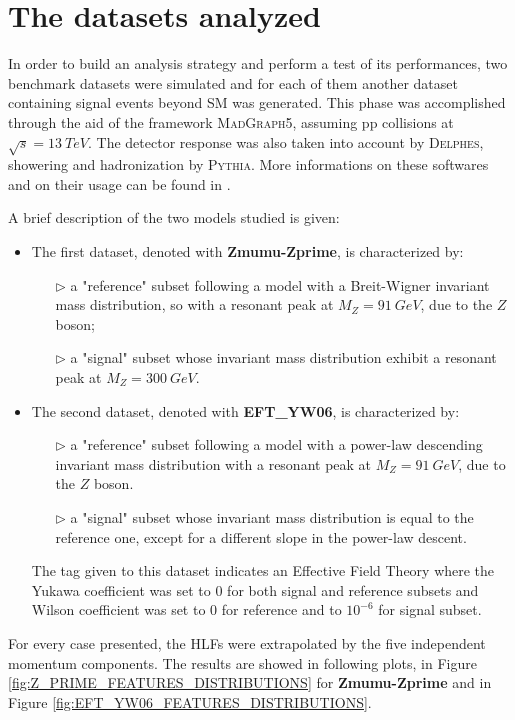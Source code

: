 \section{The datasets analyzed}
In order to build an analysis strategy and perform a test of its performances, two benchmark datasets were simulated and for each of them another dataset containing signal events beyond SM was generated. This phase was accomplished through the aid of the framework \textsc{MadGraph5}, assuming pp collisions at $\sqrt{s} = 13~\si{TeV}$. The detector response was also taken into account by \textsc{Delphes}, showering and hadronization by \textsc{Pythia}. More informations on these softwares and on their usage can be found in \cite{madgraph}.

A brief description of the two models studied is given:
\begin{itemize}
	\item The first dataset, denoted with \textbf{Zmumu-Zprime}, is characterized by:
	\begin{itemize}
		\item[$\triangleright$] a "reference" subset following a model with a Breit-Wigner invariant mass distribution, so with a resonant peak at $M_{Z} = 91~\si{GeV}$, due to the $Z$ boson;
		\item[$\triangleright$] a "signal" subset whose invariant mass distribution exhibit a resonant peak at $M_{Z} = 300~\si{GeV}$.
	\end{itemize}
	
	\item The second dataset, denoted with \textbf{EFT\_YW06}, is characterized by:
	\begin{itemize}
		\item[$\triangleright$] a "reference" subset following a model with a power-law descending invariant mass distribution with a resonant peak at $M_{Z} = 91~\si{GeV}$, due to the $Z$ boson.
		\item[$\triangleright$] a "signal" subset whose invariant mass distribution is equal to the reference one, except for a different slope in the power-law descent.
	\end{itemize}
	The tag given to this dataset indicates an Effective Field Theory where the Yukawa coefficient was set to 0 for both signal and reference subsets and Wilson coefficient was set to 0 for reference and to $10^{-6}$ for signal subset.
\end{itemize}

For every case presented, the HLFs were extrapolated by the five independent momentum components. The results are showed in following plots, in Figure \ref{fig:Z_PRIME_FEATURES_DISTRIBUTIONS} for \textbf{Zmumu-Zprime} and in Figure \ref{fig:EFT_YW06_FEATURES_DISTRIBUTIONS}.

